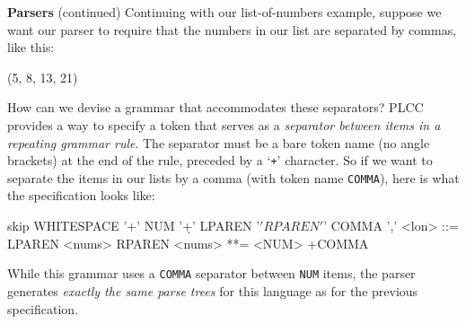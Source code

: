 \begin{minipage}[t]{\sw}
\slidenumber
\LARGE
{\bf Parsers} (continued)\exx
Continuing with our list-of-numbers example,
suppose we want our parser to require that the numbers in our list
are separated by commas, like this:
\Large
\begin{qv}
(5, 8, 13, 21)
\end{qv}
\LARGE
How can we devise a grammar that accommodates these separators?\exx
PLCC provides a way to specify a token
that serves as a {\em separator between items
in a repeating grammar rule}.
The separator must be a bare token name (no angle brackets)
at the end of the rule,
preceded by a `\verb'+'' character.
So if we want to separate the items in our lists by a comma
(with token name \verb'COMMA'),
here is what the specification looks like:
{\Large
\begin{qv}
skip WHITESPACE '\s+'
NUM '\d+'
LPAREN '\('
RPAREN '\)'
COMMA ','
%
<lon>  ::= LPAREN <nums> RPAREN
<nums> **= <NUM> +COMMA
%
\end{qv}
}
While this grammar uses a \verb'COMMA' separator between \verb'NUM' items,
the parser generates {\em exactly the same parse trees}
for this language as for the previous specification.\exx
\end{minipage}
\clearpage
